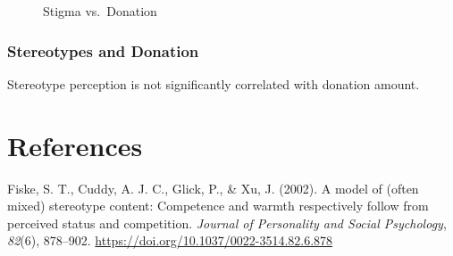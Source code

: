 \documentclass[
  man,
  floatsintext,
  longtable,
  nolmodern,
  notxfonts,
  notimes,
  colorlinks=true,linkcolor=blue,citecolor=blue,urlcolor=blue]{apa7}
\newlength{\cslhangindent}
\newenvironment{CSLReferences}[2] %
 {\begin{list}{}{%
  \setlength{\itemindent}{0pt}
  \setlength{\leftmargin}{0pt}
  \setlength{\parsep}{0pt}
  \ifodd #1
   \setlength{\leftmargin}{\cslhangindent}
   \setlength{\itemindent}{-1\cslhangindent}
  \fi
  \setlength{\itemsep}{#2\baselineskip}}}
 {\end{list}}
\begin{document}
\begin{figure}

\caption{\label{fig-correlation-stigma-donation}Stigma vs.~Donation}


\end{figure}%

\subsubsection{Stereotypes and Donation}\label{stereotypes-and-donation}

Stereotype perception is not significantly correlated with donation
amount.

\newpage

\section{References}\label{references}

\label{refs}
\begin{CSLReferences}{1}{0}
Fiske, S. T., Cuddy, A. J. C., Glick, P., \& Xu, J. (2002). A model of
(often mixed) stereotype content: {Competence} and warmth respectively
follow from perceived status and competition. \emph{Journal of
Personality and Social Psychology}, \emph{82}(6), 878--902.
\url{https://doi.org/10.1037/0022-3514.82.6.878}

\end{CSLReferences}
\end{document}
